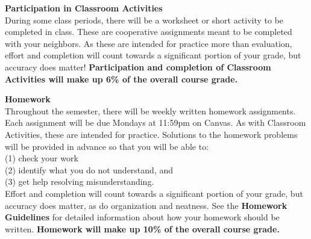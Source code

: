 \documentclass[11pt]{article}
\renewcommand{\emph}[1]{\textsf{\textbf{#1}}}
\newcommand{\localhead}[1]{\par\smallskip\textbf{#1} \smallskip\nobreak\\}%
\def\heading#1{\localhead{\large\emph{#1}}}
\begin{document}

\heading{Participation in Classroom Activities}
During some class periods, there will be a worksheet or short activity
to be completed in class. These are cooperative assignments meant to
be completed with your neighbors. As these are intended for practice
more than evaluation, effort and completion will count towards a
significant portion of your grade, but accuracy does matter!
{\bf Participation and completion of Classroom Activities will make up 6\% of the overall course
grade.}




\heading{Homework}
Throughout the semester, there will be weekly written homework assignments. Each assignment will be
due Mondays at 11:59pm on Canvas.  As with Classroom Activities,
these are intended for practice. Solutions to the homework problems will be provided in advance so that you will be able to:\\
(1) check your work\\
(2) identify what you do not understand, and \\
(3) get help resolving misunderstanding.\\
Effort and
completion will count towards a significant portion of your grade, but
accuracy does matter, as do organization and neatness. See the \textbf{Homework Guidelines} for detailed information about how your homework should be written.
{\bf Homework will make up 10\% of the overall course
grade.}
\end{document}

